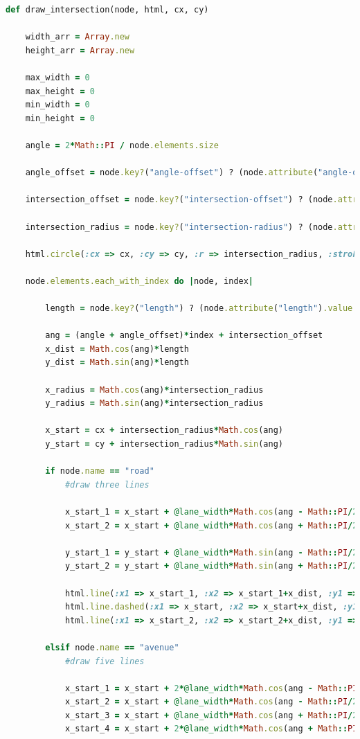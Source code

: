 \documentclass{article}
\begin{document}
\begin{lstlisting}[language=ruby]
def draw_intersection(node, html, cx, cy)
	
	width_arr = Array.new
	height_arr = Array.new
	
	max_width = 0
	max_height = 0
	min_width = 0
	min_height = 0
	
	angle = 2*Math::PI / node.elements.size
	
	angle_offset = node.key?("angle-offset") ? (node.attribute("angle-offset").value.to_f)*Math::PI/180 : 0
	
	intersection_offset = node.key?("intersection-offset") ? (node.attribute("intersection-offset").value.to_f)*Math::PI/180 : 0

	intersection_radius = node.key?("intersection-radius") ? (node.attribute("intersection-radius").value.to_f) : @intersection_radius
	
	html.circle(:cx => cx, :cy => cy, :r => intersection_radius, :stroke => "red", :fill => "white")
	
	node.elements.each_with_index do |node, index|
		
		length = node.key?("length") ? (node.attribute("length").value.to_f) : @default_length
		
		ang = (angle + angle_offset)*index + intersection_offset
		x_dist = Math.cos(ang)*length
		y_dist = Math.sin(ang)*length
		
		x_radius = Math.cos(ang)*intersection_radius
		y_radius = Math.sin(ang)*intersection_radius
		
		x_start = cx + intersection_radius*Math.cos(ang)
		y_start = cy + intersection_radius*Math.sin(ang)
					
		if node.name == "road"
			#draw three lines

			x_start_1 = x_start + @lane_width*Math.cos(ang - Math::PI/2)
			x_start_2 = x_start + @lane_width*Math.cos(ang + Math::PI/2)

			y_start_1 = y_start + @lane_width*Math.sin(ang - Math::PI/2)
			y_start_2 = y_start + @lane_width*Math.sin(ang + Math::PI/2)

			html.line(:x1 => x_start_1, :x2 => x_start_1+x_dist, :y1 => y_start_1, :y2 => y_start_1+y_dist)
			html.line.dashed(:x1 => x_start, :x2 => x_start+x_dist, :y1 => y_start, :y2 => y_start+y_dist)
			html.line(:x1 => x_start_2, :x2 => x_start_2+x_dist, :y1 => y_start_2, :y2 => y_start_2+y_dist)

		elsif node.name == "avenue"
			#draw five lines

			x_start_1 = x_start + 2*@lane_width*Math.cos(ang - Math::PI/2)
			x_start_2 = x_start + @lane_width*Math.cos(ang - Math::PI/2)
			x_start_3 = x_start + @lane_width*Math.cos(ang + Math::PI/2)
			x_start_4 = x_start + 2*@lane_width*Math.cos(ang + Math::PI/2)


\end{lstlisting}
\end{document}
